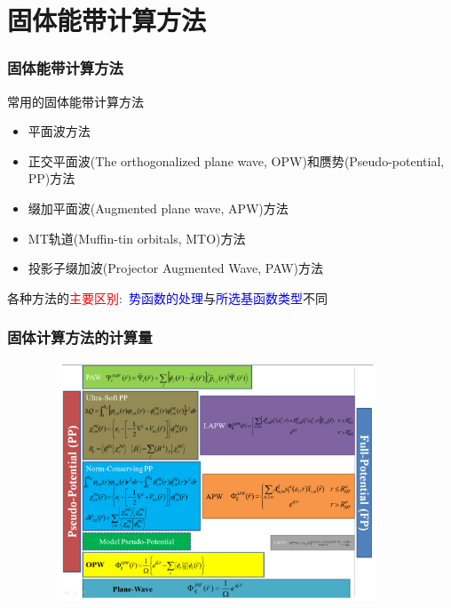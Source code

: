 \small
\section{固体能带计算方法}       %
\frame
{
\frametitle{固体能带计算方法}
\vskip 10pt
常用的固体能带计算方法
\begin{itemize}%
\setlength{\itemsep}{12pt}
	\item	平面波方法
	\item	正交平面波\textrm{(The orthogonalized plane wave, OPW)}和赝势\textrm{(Pseudo-potential, PP)}方法
	\item	缀加平面波\textrm{(Augmented plane wave, APW)}方法
	\item	\textrm{MT}轨道\textrm{(Muffin-tin orbitals, MTO)}方法
	\item	投影子缀加波\textrm{(Projector Augmented Wave, PAW)}方法
\end{itemize}
\vskip 5pt 各种方法的\textcolor{red}{主要区别}:~\textcolor{blue}{势函数的处理}与\textcolor{blue}{所选基函数类型}不同
}

\frame
{
	\frametitle{固体计算方法的计算量}
\begin{figure}[h!]
\centering
\vspace*{-0.25in}
\includegraphics[height=2.80in,width=4.10in,viewport=0 0 1150 850,clip]{Figures/Pseudo-Full_Potential-2.png}
\label{Pseudo-Full_Poential}
\end{figure}
}

